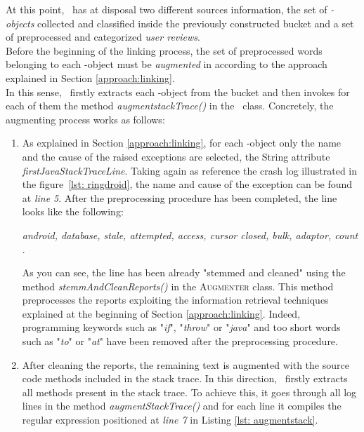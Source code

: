 At this point, \toolname\ has at disposal two different sources information, \ie the set of \textit{\Crash-objects }collected and classified inside the previously constructed bucket and a set of preprocessed and categorized \textit{user reviews}. \\
Before the beginning of the linking process, the set of preprocessed words belonging to each \Crash-object must be \textit{augmented} in according to the approach explained in Section \ref{approach:linking}. \\
In this sense, \toolname\ firstly extracts each \Crash-object from the bucket and then invokes for each of them the method 
\textit{augmentstackTrace()} in the \Crash\ class. 
Concretely, the augmenting process works as follows: 
\begin{enumerate}
\item As explained in Section \ref{approach:linking}, for each \Crash-object only the name and the cause of the raised exceptions are selected, \ie the String attribute \textit{firstJavaStackTraceLine}. Taking again as reference the crash log illustrated in the figure~\ref{lst: ringdroid}, the name and cause of the exception can be found at \textit{line 5}. 
After the preprocessing procedure has been completed, the line looks like the following: 
\begin{center}
\smallbreak
\emph{\small android, database, stale, attempted, access, cursor closed, bulk, adaptor, count }. 
\end{center} 
As you can see, the line has been already "stemmed and cleaned" using the method \textit{stemmAndCleanReports()} in the \textsc{Augmenter} class. 
This method preprocesses the reports exploiting the information retrieval techniques explained at the beginning of Section \ref{approach:linking}.
Indeed, programming keywords such as "\textit{if}", "\textit{throw}" or "\textit{java}" and too short words such as "\textit{to}" or "\textit{at}" have been removed after the preprocessing procedure. 
\item After cleaning the reports, the remaining text is augmented with the source code methods included in the stack trace. In this direction, \toolname\ firstly extracts all methods present in the stack trace. To achieve this, it goes through all log lines in the method \textit{augmentStackTrace()} and for each line it compiles the regular expression positioned at \textit{line 7} in Listing \ref{lst: augmentstack}. 


\end{enumerate}
